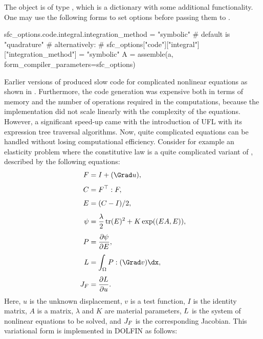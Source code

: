 \vspace*{3.5pt}

\noindent The object  is of type , which is a
dictionary with some additional functionality. One may use the following
forms to set options before passing them to .\vspace*{2pt}
\begin{python}
sfc_options.code.integral.integration_method = "symbolic" # default is "quadrature"
# alternatively:
# sfc_options["code"]["integral"]["integration_method"] = "symbolic"
A = assemble(a, form_compiler_parameters=sfc_options)
\end{python}

\vspace*{3.5pt}

Earlier versions of \sfc{} produced slow code for complicated nonlinear
equations as shown in \citet{AlnaesMardal2009b}. Furthermore, the code
generation was expensive both in terms of memory and the number of
operations required in the computations, because the \sfc{} implementation
did not scale linearly with the complexity of the equations.  However, a
significant speed-up came with the introduction of UFL with its expression
tree traversal algorithms.  Now, quite complicated equations can be
handled without losing computational efficiency. Consider for example
an elasticity problem where the constitutive law is a quite complicated
variant of \citet{Fung1993}, described by the following equations:\vspace*{3pt}
\begin{align}
F &= I + (\Grad u), \\[4pt]
C &= F^{\top}: F, \\[4pt]
E &= (C-I)/2, \\[4pt]
\psi &= \frac{\lambda}{2} \, \mbox{tr}(E)^2 + K\exp((E A,E)), \\[4pt]
P &= \frac{\partial \psi}{\partial E}, \\[4pt]
\LL &= \int_\Omega P: (\Grad v) \dx, \\[4pt]
\JJ_F &= \frac{\partial \LL}{\partial u}.\vspace*{3pt}
\end{align}
Here, $u$ is the unknown displacement, $v$ is a
test function, $I$ is the identity matrix, $A$ is a
matrix, $\lambda$ and $K$ are material parameters, $L$ is the system
of nonlinear equations to be solved, and $J_F$ is the corresponding
Jacobian.  This variational form is implemented in DOLFIN as follows:

